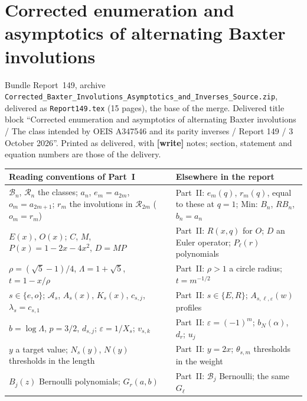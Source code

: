 \documentclass[11pt,letterpaper]{article}
\numberwithin{equation}{section}
\theoremstyle{remark}\newtheorem{remark}[theorem]{Remark}
\newcommand{\BB}{\mathcal B}
\newcommand{\RR}{\mathcal R}
\newcommand{\eps}{\varepsilon}
\newcommand{\file}[1]{\nolinkurl{#1}}
\newcommand{\partsource}[1]{\par\noindent\begin{minipage}{\textwidth}\small #1\end{minipage}\par\medskip}
\begin{document}
\part{Corrected enumeration and asymptotics of alternating Baxter involutions}\label{abx:en:part}
\partsource{Bundle Report~149, archive \file{Corrected_Baxter_Involutions_Asymptotics_and_Inverses_Source.zip}, delivered as \file{Report149.tex} (15 pages), the base of the merge. Delivered title block ``Corrected enumeration and asymptotics of alternating Baxter involutions / The class intended by OEIS A347546 and its parity inverses / Report 149 / 3 October 2026''. Printed as delivered, with \textbf{[write]} notes; section, statement and equation numbers are those of the delivery.}
\begin{center}
\small
\begin{tabular}{@{}>{\raggedright\arraybackslash}p{} >{\raggedright\arraybackslash}p{}@{}}
\toprule
Reading conventions of Part~I & Elsewhere in the report\\
\midrule
$\BB_n$, $\RR_n$ the classes; $a_n$, $e_m=a_{2m}$, $o_m=a_{2m+1}$; $r_m$ the involutions in $\RR_{2m}$ ($o_m=r_m$) & Part~II: $e_m(q)$, $r_m(q)$, equal to these at $q=1$; Min: $B_n$, $RB_n$, $b_n=a_n$\\
$E(x)$, $O(x)$; $C$, $M$, $P(x)=1-2x-4x^2$, $D=MP$ & Part~II: $R(x,q)$ for $O$; $D$ an Euler operator; $P_\ell(r)$ polynomials\\
$\rho=(\sqrt5-1)/4$, $\Lambda=1+\sqrt5$, $t=1-x/\rho$ & Part~II: $\rho>1$ a circle radius; $t=m^{-1/2}$\\
$s\in\{e,o\}$; $\mathcal A_s$, $A_s(x)$, $K_s(x)$, $c_{s,j}$, $\lambda_s=c_{s,1}$ & Part~II: $s\in\{E,R\}$; $A_{s,\ell,\eps}(w)$ profiles\\
$b=\log\Lambda$, $p=3/2$, $d_{s,j}$; $\eps=1/X_s$; $v_{s,k}$ & Part~II: $\eps=(-1)^m$; $b_N(\alpha)$, $d_r$; $u_j$\\
$y$ a target value; $N_s(y)$, $N(y)$ thresholds in the length & Part~II: $y=2x$; $\theta_{s,m}$ thresholds in the weight\\
$B_j(z)$ Bernoulli polynomials; $G_r(a,b)$ & Part~II: $\mathcal B_j$ Bernoulli; the same $G_\ell$\\
\bottomrule
\end{tabular}
\end{center}
\end{document}
